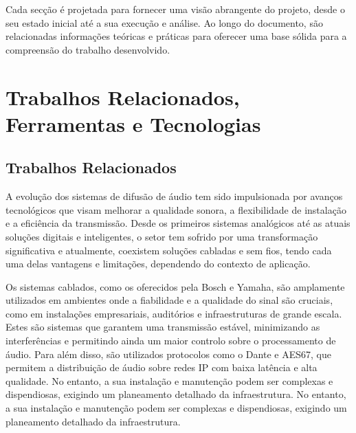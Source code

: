 \documentclass{article}
\begin{document}
Cada secção é projetada para fornecer uma visão abrangente do projeto, desde o seu estado inicial até a sua execução e análise. Ao longo do documento, são relacionadas informações teóricas e práticas para oferecer uma base sólida para a compreensão do trabalho desenvolvido.


\newpage

\section{Trabalhos Relacionados, Ferramentas e Tecnologias}
\hspace{0.5cm}

\subsection{Trabalhos Relacionados}

\vspace{0.1cm}


A evolução dos sistemas de difusão de áudio tem sido impulsionada por avanços tecnológicos que visam melhorar a qualidade sonora, a flexibilidade de instalação e a eficiência da transmissão. Desde os primeiros sistemas analógicos até as atuais soluções digitais e inteligentes, o setor tem sofrido por uma transformação significativa e atualmente, coexistem soluções cabladas e sem fios, tendo cada uma delas vantagens e limitações, dependendo do contexto de aplicação.


Os sistemas cablados, como os oferecidos pela Bosch e Yamaha, são amplamente utilizados em ambientes onde a fiabilidade e a qualidade do sinal são cruciais, como em instalações empresariais, auditórios e infraestruturas de grande escala. Estes são sistemas que garantem uma transmissão estável, minimizando as interferências e permitindo ainda um maior controlo sobre o processamento de áudio. Para além disso, são utilizados protocolos como o Dante e AES67, que permitem a distribuição de áudio sobre redes IP com baixa latência e alta qualidade. No entanto, a sua instalação e manutenção podem ser complexas e dispendiosas, exigindo um planeamento detalhado da infraestrutura. No entanto, a sua instalação e manutenção podem ser complexas e dispendiosas, exigindo um planeamento detalhado da infraestrutura.
\end{document}
